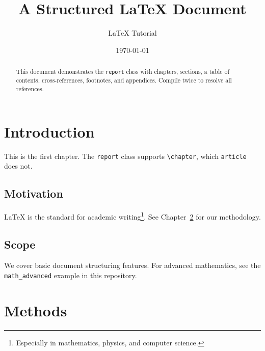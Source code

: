 \documentclass[12pt, a4paper]{report}
\title{A Structured \LaTeX{} Document}
\author{LaTeX Tutorial}
\date{\today}
\begin{document}
\maketitle

\begin{abstract}
This document demonstrates the \texttt{report} class with chapters, sections,
a table of contents, cross-references, footnotes, and appendices. Compile
twice to resolve all references.
\end{abstract}

\tableofcontents
\listoffigures
\listoftables
\newpage

\chapter{Introduction}
\label{chap:intro}

This is the first chapter. The \texttt{report} class supports
\verb|\chapter|, which \texttt{article} does not.

\section{Motivation}
\label{sec:motivation}

LaTeX is the standard for academic writing\footnote{Especially in mathematics,
physics, and computer science.}. See Chapter~\ref{chap:methods} for our
methodology.

\section{Scope}
\label{sec:scope}

We cover basic document structuring features. For advanced mathematics, see the
\texttt{math\_advanced} example in this repository.

\chapter{Methods}
\label{chap:methods}
\end{document}
